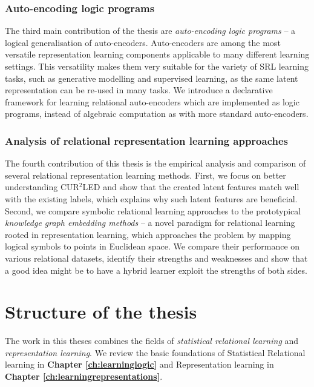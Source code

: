 \subsubsection{Auto-encoding logic programs}

The third main contribution of the thesis are \textit{auto-encoding logic programs} \cite{Dumancic2018a,AlpsSubmitted} -- a logical generalisation of auto-encoders.
Auto-encoders are among the most versatile representation learning components applicable to many different learning settings.
This versatility makes them very suitable for the variety of SRL learning tasks, such as generative modelling and supervised learning, as the same latent representation can be re-used in many tasks.
We introduce a declarative framework for learning relational auto-encoders which are implemented as logic programs, instead of algebraic computation as with more standard auto-encoders.






\subsubsection{Analysis of relational representation learning approaches}

The fourth contribution of this thesis is the empirical analysis and comparison of several relational representation learning methods.
First, we focus on better understanding CUR$^2$LED and show that the created latent features match well with the existing labels, which explains why such latent features are beneficial.
Second, we compare symbolic relational learning approaches to the prototypical \textit{knowledge graph embedding methods} -- a novel paradigm for relational learning rooted in representation learning, which approaches the problem by mapping logical symbols to points in Euclidean space.
We compare their performance on various relational datasets, identify their strengths and weaknesses and show that a good idea might be to have a hybrid learner exploit the strengths of both sides.








\section{Structure of the thesis}


The work in this theses combines the fields of \textit{statistical relational learning} and \textit{representation learning}.
We review the basic foundations of Statistical Relational learning in \textbf{Chapter \ref{ch:learninglogic}} and Representation learning in \textbf{Chapter \ref{ch:learningrepresentations}}.


